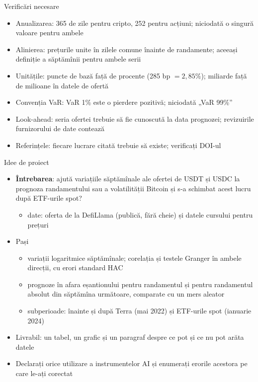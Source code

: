 \begin{frame}{Verificări necesare}
\itemsize{\small}
\begin{itemize}
    \item Anualizarea: 365 de zile pentru cripto, 252 pentru acțiuni; niciodată o singură valoare pentru ambele
    \item Alinierea: prețurile unite în zilele comune înainte de randamente; aceeași definiție a săptămînii pentru ambele serii
    \item Unitățile: puncte de bază față de procente (285 bp $= 2{,}85\%$); miliarde față de milioane în datele de ofertă
    \item Convenția VaR: VaR 1\% este o pierdere pozitivă; niciodată „VaR 99\%”
    \item Look-ahead: seria ofertei trebuie să fie cunoscută la data prognozei; revizuirile furnizorului de date contează
    \item Referințele: fiecare lucrare citată trebuie să existe; verificați DOI-ul
\end{itemize}
\end{frame}

\begin{frame}{Idee de proiect}
\itemsize{\small}
\begin{itemize}
    \item \textbf{Întrebarea}: ajută variațiile săptămînale ale ofertei de USDT și USDC la prognoza randamentului sau a volatilității Bitcoin și s-a schimbat acest lucru după ETF-urile spot?
    \begin{itemize}
        \item date: oferta de la DefiLlama (publică, fără cheie) și datele cursului pentru prețuri
    \end{itemize}
    \item Pași
    \begin{itemize}
        \item variații logaritmice săptămînale; corelația și testele Granger în ambele direcții, cu erori standard HAC
        \item prognoze în afara eșantionului pentru randamentul și pentru randamentul absolut din săptămîna următoare, comparate cu un mers aleator
        \item subperioade: înainte și după Terra (mai 2022) și ETF-urile spot (ianuarie 2024)
    \end{itemize}
    \item Livrabil: un tabel, un grafic și un paragraf despre ce pot și ce nu pot arăta datele
    \item Declarați orice utilizare a instrumentelor AI și enumerați erorile acestora pe care le-ați corectat
\end{itemize}
\end{frame}



